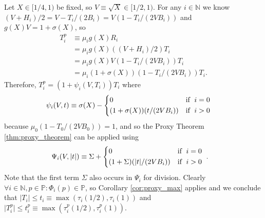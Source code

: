 \documentclass[10pt]{article}
\theoremstyle{definition}
\theoremstyle{remark}
\numberwithin{equation}{section}
\newcommand{\nats}{\mathbb{N}}
\newcommand{\pee}{\mathbb{P}}
\newcommand{\abs}[1]{\lvert #1 \rvert}
\begin{document}
Let $X \in [1/4,1)$ be fixed, so $V \equiv \sqrt{X} \in [1/2,1)$.
For any $i \in \nats$ we know $(V+H_i)/2 = V - T_i/(2B_i) = V (1 - T_i/(2VB_i))$ and $g(X)V = 1 + \sigma(X)$, so
\begin{align*}
	T^p_i &\equiv \mu_i g(X)  R_i \\
	      &= \mu_i g(X)          ((V + H_i)/2) T_i \\
	      &= \mu_i g(X) V        (1 - T_i/(2VB_i)) T_i \\
	      &= \mu_i (1+\sigma(X)) (1 - T_i/(2VB_i)) T_i .
\end{align*}
Therefore, $T^p_i = (1+\psi_i(V,T_i)) T_i$ where
\begin{align*}
	\psi_i(V,t) &\equiv \sigma(X) - \begin{cases*}
0 & \text{if}\; $i=0$ \\
(1+\sigma(X))(t/(2 V B_i))& \text{if}\; $i > 0$
\end{cases*}
\end{align*}
because $\mu_0 (1-T_0/(2VB_0)) = 1$, and so the Proxy Theorem \ref{thm:proxy_theorem} can be applied using
\begin{align*}
\Psi_i(V,\abs{t}) &\equiv \Sigma + \begin{cases*}
0 & \text{if}\; $i=0$ \\
(1+\Sigma)(\abs{t}/(2 V B_i))& \text{if}\; $i > 0$
\end{cases*} .
\end{align*}
Note that the first term $\Sigma$ also occurs in $\Psi_i$ for division. Clearly $\forall i \in \nats, p \in \pee: \Phi_i(p) \in \pee$, so
Corollary \ref{cor:proxy_max} applies and we conclude that $\abs{T_i} \le t_i \equiv \max{(\tau_i(1/2),\tau_i(1))}$ and $\abs{T^p_i} \le t_i^p \equiv \max{(\tau_i^p(1/2),\tau_i^p(1))}$.
\end{document}
